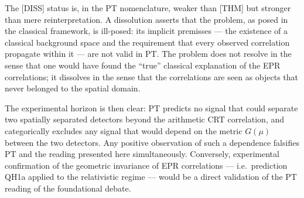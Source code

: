 The [DISS] status is, in the PT nomenclature, weaker than [THM]
but stronger than mere reinterpretation. A dissolution asserts
that the problem, as posed in the classical framework, is
ill-posed: its implicit premisses --- the existence of a
classical background space and the requirement that every
observed correlation propagate within it --- are not valid in
PT. The problem does not resolve in the sense that one would
have found the ``true'' classical explanation of the EPR
correlations; it dissolves in the sense that the correlations
are seen as objects that never belonged to the spatial domain.

The experimental horizon is then clear: PT predicts no signal
that could separate two spatially separated detectors beyond the
arithmetic CRT correlation, and categorically excludes any
signal that would depend on the metric $G(\mu)$ between the two
detectors. Any positive observation of such a dependence
falsifies PT and the reading presented here simultaneously.
Conversely, experimental confirmation of the geometric invariance
of EPR correlations --- i.e.\ prediction QH1a applied to the
relativistic regime --- would be a direct validation of the PT
reading of the foundational debate.
